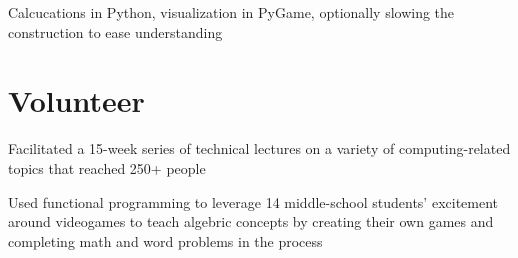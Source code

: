 \documentclass[letterpaper]{deedy-resume} %
\begin{document}
\begin{minipage}[t]{0.66\textwidth}

Calcucations in Python, visualization in PyGame, optionally slowing the construction to ease understanding \\
\sectionspace %


\section{Volunteer}


\begin{tightitemize}
\item Facilitated a 15-week series of technical lectures on a variety of computing-related topics that reached 250+ people
\end{tightitemize}

\sectionspace %



\begin{tightitemize}
\item Used functional programming to leverage 14 middle-school students' excitement around videogames to teach algebric concepts by creating their own games and completing math and word problems in the process
\end{tightitemize}

\sectionspace %


\end{minipage} %
\end{document}
